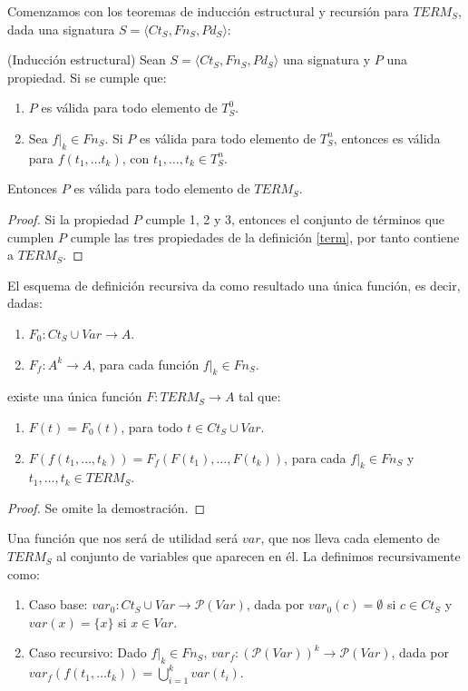 Comenzamos con los teoremas de inducción estructural y recursión para $TERM_S$, dada una signatura $S = \langle Ct_{S}, Fn_{S}, Pd_{S}\rangle$:

\begin{prop}(Inducción estructural)
Sean $S = \langle Ct_{S}, Fn_{S}, Pd_{S}\rangle$ una signatura y $P$ una propiedad. Si se cumple que:
\begin{enumerate}
    \item $P$ es válida para todo elemento de $T_{S}^{0}$.
    \item Sea $f|_k \in Fn_S$. Si $P$ es válida para todo elemento de $T_{S}^{n}$, entonces es válida para $f(t_1, \dots t_k)$, con $t_1, \dots, t_k \in T_{S}^{n}$.
\end{enumerate}
Entonces $P$ es válida para todo elemento de $TERM_S$.
\end{prop}
\begin{proof}
Si la propiedad $P$ cumple 1, 2 y 3, entonces el conjunto de términos que cumplen $P$ cumple las tres propiedades de la definición \ref{term}, por tanto contiene a $TERM_S$.
\end{proof}



 \begin{prop} El esquema de definición recursiva da como resultado una única función, es decir, dadas:
\begin{enumerate}
    \item $F_0: Ct_S \cup Var \rightarrow A$.
    \item $F_f: A^{k} \rightarrow A$, para cada función $f|_{k} \in Fn_S$.
\end{enumerate}
existe una única función $F: TERM_S \rightarrow A$ tal que:
\begin{enumerate}
    \item $F(t)=F_0(t)$, para todo $t\in Ct_S \cup Var$.
    \item $F(f(t_1,\dots,t_k))=F_f(F(t_1),\dots,F(t_k))$, para cada $f|_{k} \in Fn_S$ y $t_1,\dots,t_k\in TERM_S$.
\end{enumerate}
\begin{proof}
Se omite la demostración.
\end{proof}
\end{prop}


\begin{example}
Una función que nos será de utilidad será $var$, que nos lleva cada elemento de $TERM_S$ al conjunto de variables que aparecen en él. La definimos recursivamente como:
\begin{enumerate}
    \item Caso base: $var_{0}: Ct_S \cup Var \rightarrow \mathcal{P} (Var)$, dada por $var_{0}(c) = \emptyset$ si $c \in Ct_S$ y $var(x) = \{x\}$ si $x \in Var$.
    \item Caso recursivo: Dado $f|_{k} \in Fn_S$, $var_{f}: (\mathcal{P} (Var))^{k} \rightarrow \mathcal{P} (Var)$, dada por $var_{f}(f(t_1, \dots t_k)) = \bigcup\limits_{i = 1}^{k} var(t_i)$.
\end{enumerate}
\end{example}


